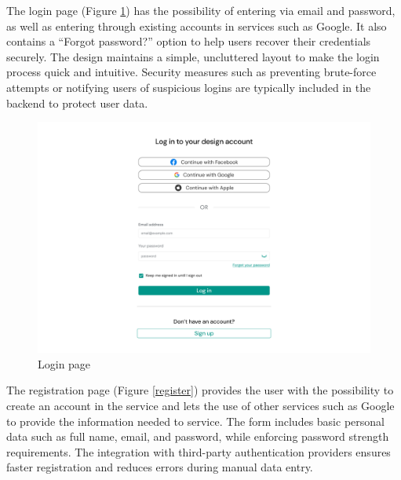 The login page (Figure \ref{login}) has the possibility of entering via email and password, as well as entering through existing accounts in services such as Google. 
It also contains a ``Forgot password?'' option to help users recover their credentials securely. 
The design maintains a simple, uncluttered layout to make the login process quick and intuitive. 
Security measures such as preventing brute-force attempts or notifying users of suspicious logins are typically included in the backend to protect user data.

\begin{figure}[H]
    \centering
    \includegraphics[width=18cm]{"images/figmaUI/login-crop.png"}
    \caption{Login page}
    \label{login}
\end{figure}

The registration page (Figure \ref{register}) provides the user with the possibility to create an account in the service and lets the use of other services such as Google to provide the information needed to service. 
The form includes basic personal data such as full name, email, and password, while enforcing password strength requirements. 
The integration with third-party authentication providers ensures faster registration and reduces errors during manual data entry.

